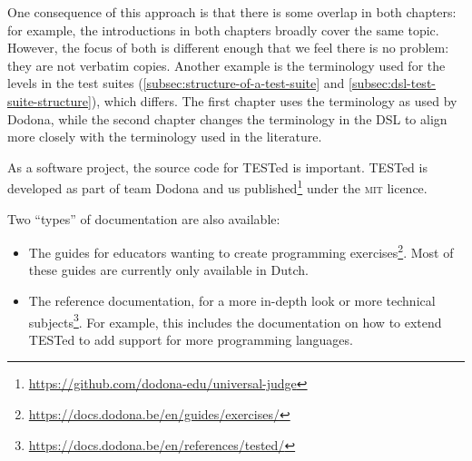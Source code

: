 \documentclass[./main]{subfiles}
\begin{document}
One consequence of this approach is that there is some overlap in both chapters: for example, the introductions in both chapters broadly cover the same topic.
However, the focus of both is different enough that we feel there is no problem: they are not verbatim copies.
Another example is the terminology used for the levels in the test suites (\vref{subsec:structure-of-a-test-suite} and \vref{subsec:dsl-test-suite-structure}), which differs.
The first chapter uses the terminology as used by Dodona, while the second chapter changes the terminology in the DSL to align more closely with the terminology used in the literature.

As a software project, the source code for TESTed is important.
TESTed is developed as part of team Dodona and us published\footnote{\url{https://github.com/dodona-edu/universal-judge}} under the \textsc{mit} licence.

Two ``types'' of documentation are also available:

\begin{itemize}
    \item The guides for educators wanting to create programming exercises\footnote{\url{https://docs.dodona.be/en/guides/exercises/}}.
          Most of these guides are currently only available in Dutch.
    \item The reference documentation, for a more in-depth look or more technical subjects\footnote{\url{https://docs.dodona.be/en/references/tested/}}.
          For example, this includes the documentation on how to extend TESTed to add support for more programming languages.
\end{itemize}
\end{document}

